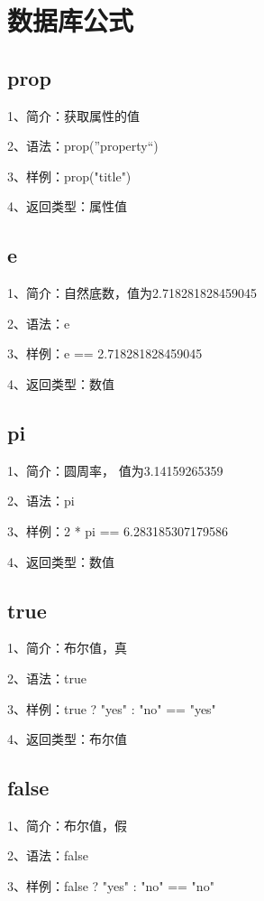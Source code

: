 \chapter{数据库公式}

\section{prop}

1、简介：获取属性的值

2、语法：prop(”property“)

3、样例：prop("title")

4、返回类型：属性值

\section{e}

1、简介：自然底数，值为2.718281828459045

2、语法：e

3、样例：e == 2.718281828459045

4、返回类型：数值

\section{pi}

1、简介：圆周率， 值为3.14159265359

2、语法：pi

3、样例：2 * pi == 6.283185307179586

4、返回类型：数值

\section{true}

1、简介：布尔值，真

2、语法：true

3、样例：true ? "yes" : "no" == "yes"

4、返回类型：布尔值

\section{false}

1、简介：布尔值，假

2、语法：false

3、样例：false ? "yes" : "no" == "no"

